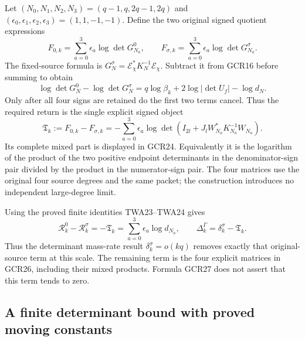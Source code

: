 \documentclass[11pt,a4paper]{article}
\begin{document}
Let $(N_0,N_1,N_2,N_3)=(q-1,q,2q-1,2q)$ and
$(\epsilon_0,\epsilon_1,\epsilon_2,\epsilon_3)=(1,1,-1,-1)$.
Define the two original signed quotient expressions
\[
 F_{0,k}=\sum_{a=0}^3\epsilon_a\log\det G_{N_a}^0,\qquad
 F_{\sigma,k}=\sum_{a=0}^3\epsilon_a\log\det G_{N_a}^\sigma.
\]
The fixed-source formula is
$G_N^\sigma=\mathcal E_\chi^*K_N^{-1}\mathcal E_\chi$.
Subtract it from GCR16 before summing to obtain
\[
 \log\det G_N^0-\log\det G_N^\sigma
      =q\log\beta_k+2\log|\det U_f|-\log d_N.
\tag{GCR25}
\]
Only after all four signs are retained do the first two terms
cancel. Thus the required return is the single explicit signed
object
\[
 \boxed{\quad
 \mathfrak T_k:=F_{0,k}-F_{\sigma,k}
    =-\sum_{a=0}^3\epsilon_a\log
       \det\!\left(I_{2l}
           +J_lW_{N_a}^*K_{N_a}^{-1}W_{N_a}\right).
 \quad}\tag{GCR26}
\]
Its complete mixed part is displayed in GCR24.
Equivalently it is the logarithm of the product of the two
positive endpoint determinants in the denominator-sign pair
divided by the product in the numerator-sign pair.
The four matrices use the original four source degrees and
the same packet; the construction introduces no independent
large-degree limit.

Using the proved finite identities TWA23--TWA24 gives
\[
 \mathcal R_k^0-\mathcal R_k^\sigma=-\mathfrak T_k
       =\sum_{a=0}^3\epsilon_a\log d_{N_a},\qquad
 \Delta_k^\Gamma=\delta_k^\sigma-\mathfrak T_k.
\tag{GCR27}
\]
Thus the determinant mass-rate result
$\delta_k^\sigma=o(kq)$ removes exactly that original-source
term at this scale. The remaining term is the four explicit
matrices in GCR26, including their mixed products. Formula
GCR27 does not assert that this term tends to zero.

\subsection{A finite determinant bound with proved moving constants}
\end{document}

